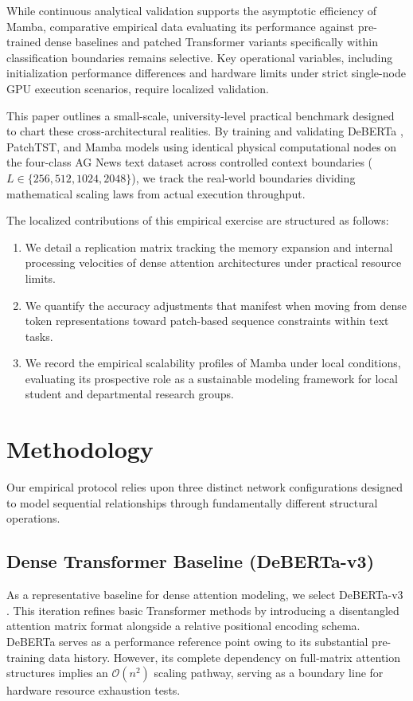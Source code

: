 \documentclass[runningheads]{llncs}
\begin{document}
While continuous analytical validation supports the asymptotic efficiency of Mamba, comparative empirical data evaluating its performance against pre-trained dense baselines and patched Transformer variants specifically within classification boundaries remains selective. Key operational variables, including initialization performance differences and hardware limits under strict single-node GPU execution scenarios, require localized validation.

This paper outlines a small-scale, university-level practical benchmark designed to chart these cross-architectural realities. By training and validating DeBERTa \cite{deberta}, PatchTST, and Mamba models using identical physical computational nodes on the four-class AG News text dataset \cite{agnews} across controlled context boundaries ($L \in \{256, 512, 1024, 2048\}$), we track the real-world boundaries dividing mathematical scaling laws from actual execution throughput.

The localized contributions of this empirical exercise are structured as follows:
\begin{enumerate}
    \item We detail a replication matrix tracking the memory expansion and internal processing velocities of dense attention architectures under practical resource limits.
    \item We quantify the accuracy adjustments that manifest when moving from dense token representations toward patch-based sequence constraints within text tasks.
    \item We record the empirical scalability profiles of Mamba under local conditions, evaluating its prospective role as a sustainable modeling framework for local student and departmental research groups.
\end{enumerate}

\section{Methodology}
Our empirical protocol relies upon three distinct network configurations designed to model sequential relationships through fundamentally different structural operations.

\subsection{Dense Transformer Baseline (DeBERTa-v3)}
As a representative baseline for dense attention modeling, we select DeBERTa-v3 \cite{deberta}. This iteration refines basic Transformer methods by introducing a disentangled attention matrix format alongside a relative positional encoding schema. DeBERTa serves as a performance reference point owing to its substantial pre-training data history. However, its complete dependency on full-matrix attention structures implies an $\mathcal{O}(n^2)$ scaling pathway, serving as a boundary line for hardware resource exhaustion tests.
\end{document}
